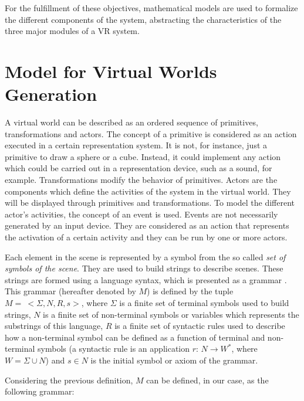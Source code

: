 For the fulfillment of these objectives, mathematical models are used to formalize the different
components of the system, abstracting the characteristics of the three major modules of a VR
system.




\section{Model for Virtual Worlds Generation
\label{sec:model}}

A virtual world can be described as an ordered sequence of primitives, transformations and actors.
The concept of a primitive is considered as an action executed in a certain representation system.
It is not, for instance, just a primitive to draw a sphere or a cube. Instead, it could implement
any action which could be carried out in a representation device, such as a sound, for example.
Transformations modify the behavior of primitives. Actors are the components which define the
activities of the system in the virtual world. They will be displayed through primitives and
transformations. To model the different actor's activities, the concept of an event is used. Events
are not necessarily generated by an input device. They are considered as an action that represents
the activation of a certain activity and they can be run by one or more actors.

Each element in the scene is represented by a symbol from the so called \textit{set of symbols of
the scene}. They are used to build strings to describe scenes. These strings are formed using a
language syntax, which is presented as a grammar \cite{Davis1994}. This grammar (hereafter denoted
by $M$) is defined by the tuple $M= \ <\Sigma, N, R, s>$, where $\Sigma$ is a finite set of
terminal symbols used to build strings, $N$ is a finite set of non-terminal symbols or variables
which represents the substrings of this language, $R$ is a finite set of syntactic rules used to
describe how a non-terminal symbol can be defined as a function of terminal and non-terminal
symbols (a syntactic rule is an application $r$: $N \rightarrow W^*$, where $W = \Sigma \cup N$)
and $s \in N$ is the initial symbol or axiom of the grammar.

Considering the previous definition, $M$ can be defined, in our case, as the following grammar:

